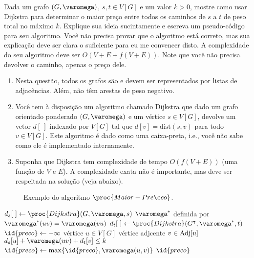 Dada um grafo $(G, \varomega)$, $s, t \in V[G]$ e um valor $k > 0$, mostre como usar Dijkstra para determinar o maior preço entre todos os caminhos de $s$ a $t$ de peso total no máximo $k$. Explique sua ideia sucintamente e escreva um pseudo-código para seu algoritmo. Você não  precisa provar que o algoritmo está correto, mas sua explicação deve ser clara o suficiente para eu me convencer disto. A complexidade do seu algoritmo deve ser $O(V+E + f(V+E))$. Note que você não precisa devolver o caminho, apenas o preço dele.

\begin{enumerate}[label={(\alph*)}]
    \item Nesta questão, todos os grafos são e devem ser representados por listas de adjacências. Além, não têm arestas de peso negativo.

    \item Você tem à disposição um algoritmo chamado Dijkstra que dado um grafo orientado ponderado $(G, \varomega)$ e um vértice $s \in V[G]$, devolve um vetor $d[~]$ indexado por $V[G]$ tal que $d[v] = \mathrm{dist}(s, v)$ para todo $v \in V[G]$. Este algoritmo é dado como uma caixa-preta, i.e., você não sabe como ele é implementado internamente.

    \item Suponha que Dijkstra tem complexidade de tempo $O(f(V+E))$ (uma função de $V$ e $E$). A complexidade exata não é importante, mas deve ser respeitada na solução (veja abaixo).
\end{enumerate}

\itemdsep

\begin{figure}[H]
    \centering
    

    \caption{Exemplo do algoritmo $\proc{Maior-Preço}$.}
    \label{fig:ex2}
\end{figure}

\begin{codebox}

    \li $d_s[~] \Recebe \proc{Dijkstra}(G, \varomega, s)$
    \li \Seja $\varomega^*$ definida por $\varomega^*(u v) = \varomega(v u)$
    \li $d_t[~] \Recebe \proc{Dijkstra}(G^\intercal, \varomega^*, t)$
    \li
    \li $\id{preco} \Recebe -\infty$
    \li \Para \Cada vértice $u \in V[G]$ \Faca
        \Do
    \li     \Para \Cada vértice adjcente $v \in \operatorname{Adj}[u]$ \Faca
            \Do
    \li         \Se $d_s[u] + \varomega(u v) + d_t[v] \leq k$
                \Do
    \li             \Entao $\id{preco} \Recebe \max\{\id{preco}, \varomega(u, v)\}$
                \End
            \End
        \End
    \li \Devolva $\id{preco}$
\end{codebox}
